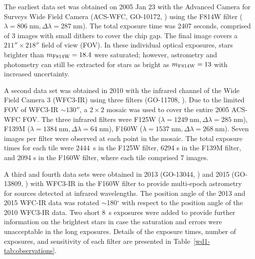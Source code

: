 \documentclass[12pt]{ucsddissertation}
\begin{document}
\begin{CJK*}{UTF8}{gbsn}
The earliest data set was obtained on 2005 Jan 23 with the Advanced Camera for Surveys Wide Field Camera (ACS-WFC, GO-10172, \citealt{prop10172D}) using the F814W filter ($\lambda = 806\;\mathrm{nm}, \Delta\lambda = 287\;\mathrm{nm}$). 
The total exposure time was 2407 seconds, comprised of 3 images with small dithers to cover the chip gap. The final image covers a $211''\times218''$ field of view (FOV). 
In these individual optical exposures, stars brighter than $m_{\rm F814W}=18.4$ were saturated; however, astrometry and photometry can still be extracted for stars as bright as $m_{\rm F814W}=13$ with increased uncertainty. 

A second data set was obtained in 2010 with the infrared channel of the Wide Field Camera 3 (WFC3-IR) using three filters (GO-11708, \citealt{prop11708A}). Due to the limited FOV of WFC3-IR $\sim130''$, a $2\times2$ mosaic was used to cover the entire 2005 ACS-WFC FOV. The three infrared filters were  F125W ($\lambda = 1249\;\mathrm{nm}, \Delta\lambda = 285\;\mathrm{nm}$),  F139M ($\lambda = 1384\;\mathrm{nm}, \Delta\lambda = 64\;\mathrm{nm}$),  F160W ($\lambda = 1537\;\mathrm{nm}, \Delta\lambda = 268\;\mathrm{nm}$). Seven images per filter were observed at each point in the mosaic. The total exposure times for each tile were $2444$~s in the F125W filter, 6294 s in the F139M filter, and 2094 s in the F160W filter, where each tile comprised 7 images. 

A third and fourth data sets were obtained in 2013 (GO-13044, \citealt{prop13044L}) and 2015 (GO-13809, \citealt{prop13809L}) with WFC3-IR in the F160W filter to provide multi-epoch astrometry for sources detected at infrared wavelengths. The position angle of the 2013 and 2015 WFC-IR data was rotated $\sim$180$^\circ$ with respect to the position angle of the 2010 WFC3-IR data. Two short $8$~s exposures were added to provide further information on the brightest stars in case the saturation and errors were unacceptable in the long exposures. Details of the exposure times, number of exposures, and sensitivity of each filter are presented in Table~\ref{wd1-tab:observations}.



\end{CJK*}
\end{document}
